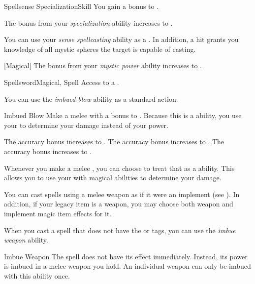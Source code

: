 \begin{feat}{Spellsense Specialization}{Skill}
         You gain a  bonus to  .

         The bonus from your \textit{specialization} ability increases to .

         You can use your \textit{sense spellcasting} ability as a .
        In addition, a hit grants you knowledge of all mystic spheres the target is capable of casting.

        [Magical] The bonus from your \textit{mystic power} ability increases to .
    \end{feat}

    \begin{feat}{Spellsword}{Magical, Spell}
        \featpre Access to a .

         You can use the \textit{imbued blow} ability as a standard action.
        \begin{freeability}{Imbued Blow}
            Make a melee  with a  bonus to .
            Because this is a  ability, you use your   to determine your damage instead of your  power.

            \rankline
             The accuracy bonus increases to .
             The accuracy bonus increases to .
             The accuracy bonus increases to .
        \end{freeability}

         Whenever you make a melee , you can choose to treat that as a  ability.
        This allows you to use your  with magical abilities to determine your damage.

         You can cast spells using a melee weapon as if it were an implement (see ).
        In addition, if your legacy item is a weapon, you may choose both weapon and implement magic item effects for it.

         When you cast a spell that does not have the  or  tags,
            you can use the \textit{imbue weapon} ability.
        \begin{attuneability}{Imbue Weapon}
            \rankline
            The spell does not have its effect immediately.
            Instead, its power is imbued in a melee weapon you hold.
            An individual weapon can only be imbued with this ability once.


\end{attuneability}
\end{feat}
